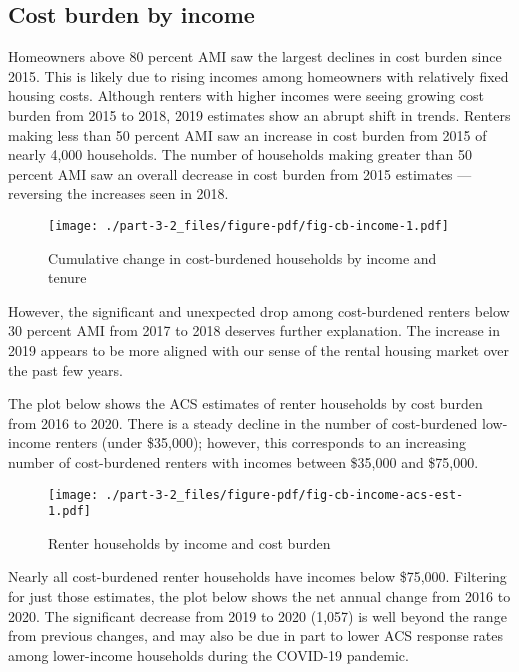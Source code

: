 \documentclass[
  letterpaper,
  DIV=11,
  numbers=noendperiod]{scrreprt}
\begin{document}
\hypertarget{cost-burden-by-income}{%
\subsection{Cost burden by income}\label{cost-burden-by-income}}

Homeowners above 80 percent AMI saw the largest declines in cost burden
since 2015. This is likely due to rising incomes among homeowners with
relatively fixed housing costs. Although renters with higher incomes
were seeing growing cost burden from 2015 to 2018, 2019 estimates show
an abrupt shift in trends. Renters making less than 50 percent AMI saw
an increase in cost burden from 2015 of nearly 4,000 households. The
number of households making greater than 50 percent AMI saw an overall
decrease in cost burden from 2015 estimates --- reversing the increases
seen in 2018.

\begin{figure}

{\centering \texttt{[image: ./part-3-2\_files/figure-pdf/fig-cb-income-1.pdf]}

}

\caption{\label{fig-cb-income}Cumulative change in cost-burdened
households by income and tenure}

\end{figure}

However, the significant and unexpected drop among cost-burdened renters
below 30 percent AMI from 2017 to 2018 deserves further explanation. The
increase in 2019 appears to be more aligned with our sense of the rental
housing market over the past few years.

The plot below shows the ACS estimates of renter households by cost
burden from 2016 to 2020. There is a steady decline in the number of
cost-burdened low-income renters (under \$35,000); however, this
corresponds to an increasing number of cost-burdened renters with
incomes between \$35,000 and \$75,000.

\begin{figure}

{\centering \texttt{[image: ./part-3-2\_files/figure-pdf/fig-cb-income-acs-est-1.pdf]}

}

\caption{\label{fig-cb-income-acs-est}Renter households by income and
cost burden}

\end{figure}

Nearly all cost-burdened renter households have incomes below \$75,000.
Filtering for just those estimates, the plot below shows the net annual
change from 2016 to 2020. The significant decrease from 2019 to 2020
(1,057) is well beyond the range from previous changes, and may also be
due in part to lower ACS response rates among lower-income households
during the COVID-19 pandemic.
\end{document}
